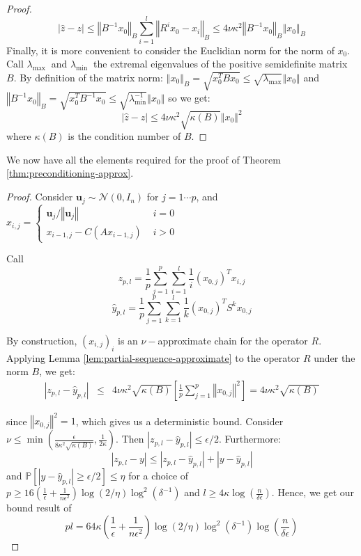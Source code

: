 \begin{proof}
\[\left|\hat{z}-z\right|\leq\left\Vert B^{-1}x_{0}\right\Vert _{B}\sum_{i=1}^{l}\left\Vert R^{i}x_{0}-x_{i}\right\Vert _{B}\leq4\nu\kappa^{2}\left\Vert B^{-1}x_{0}\right\Vert _{B}\left\Vert x_{0}\right\Vert _{B}
\]
Finally, it is more convenient to consider the Euclidian norm for
the norm of $x_{0}$. Call $\lambda_{\text{max }}$ and $\lambda_{\text{min }}$
the extremal eigenvalues of the positive semidefinite matrix $B$.
By definition of the matrix norm: $\left\Vert x_{0}\right\Vert _{B}=\sqrt{x_{0}^{T}Bx_{0}}\leq\sqrt{\lambda_{\text{max}}}\left\Vert x_{0}\right\Vert $
and $\left\Vert B^{-1}x_{0}\right\Vert _{B}=\sqrt{x_{0}^{T}B^{-1}x_{0}}\leq\sqrt{\lambda_{\text{min}}^{-1}}\left\Vert x_{0}\right\Vert $
so we get: 
\[
\left|\hat{z}-z\right|\leq4\nu\kappa^{2}\sqrt{\kappa\left(B\right)}\left\Vert x_{0}\right\Vert ^{2}
\]
where $\kappa\left(B\right)$ is the condition number of $B$. 
\end{proof}
We now have all the elements required for the proof of Theorem \ref{thm:preconditioning-approx}.
\begin{proof}
Consider $\mathbf{u}_{j}\sim\mathcal{N}\left(0,I_{n}\right)$ for
$j=1\cdots p$, and $x_{i,j}=\begin{cases}
\mathbf{u}_{j}/\left\Vert \mathbf{u}_{j}\right\Vert  & \,\, i=0\\
x_{i-1,j}-C\left(Ax_{i-1,j}\right) & \,\, i>0
\end{cases}$

Call 
\[
z_{p,l}=\frac{1}{p}\sum_{j=1}^{p}\sum_{i=1}^{l}\frac{1}{i}\left(x_{0,j}\right)^{T}x_{i,j}
\]
\[
\hat{y}_{p,l}=\frac{1}{p}\sum_{j=1}^{p}\sum_{k=1}^{l}\frac{1}{k}\left(x_{0,j}\right)^{T}S^{k}x_{0,j}
\]


By construction, $\left(x_{i,j}\right)_{i}$ is an $\nu-$approximate
chain for the operator $R$. Applying Lemma \ref{lem:partial-sequence-approximate}
to the operator $R$ under the norm $B$, we get: 
\begin{eqnarray*}
\left|z_{p,l}-\hat{y}_{p,l}\right| & \leq & 4\nu\kappa^{2}\sqrt{\kappa\left(B\right)}\left[\frac{1}{p}\sum_{j=1}^{p}\left\Vert x_{0,j}\right\Vert ^{2}\right]=4\nu\kappa^{2}\sqrt{\kappa\left(B\right)}
\end{eqnarray*}


since $\left\Vert x_{0,j}\right\Vert ^{2}=1$, which gives us a deterministic
bound. Consider $\nu\leq\min\left(\frac{\epsilon}{8\kappa^{2}\sqrt{\kappa\left(B\right)}},\frac{1}{2\kappa}\right)$.
Then $\left|z_{p,l}-\hat{y}_{p,l}\right|\leq\epsilon/2$. Furthermore:
\[
\left|z_{p,l}-y\right|\leq\left|z_{p,l}-\hat{y}_{p,l}\right|+\left|y-\hat{y}_{p,l}\right|
\]
and $\mathbb{P}\left[\left|y-\hat{y}_{p,l}\right|\geq\epsilon/2\right]\leq\eta$
for a choice of $p\geq16\left(\frac{1}{\epsilon}+\frac{1}{n\epsilon^{2}}\right)\log\left(2/\eta\right)\log^{2}\left(\delta^{-1}\right)$
and $l\geq4\kappa\log\left(\frac{n}{\delta\epsilon}\right)$. Hence,
we get our bound result of 
\[
pl=64\kappa\left(\frac{1}{\epsilon}+\frac{1}{n\epsilon^{2}}\right)\log\left(2/\eta\right)\log^{2}\left(\delta^{-1}\right)\log\left(\frac{n}{\delta\epsilon}\right)
\]
\end{proof}

